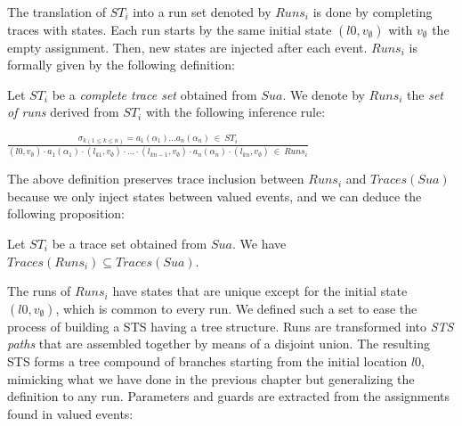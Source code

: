 The translation of $ST_i$ into a run set denoted by $Runs_i$ is
done by completing traces with states. Each run starts by the
same initial state $(l0,v_\emptyset)$ with $v_\emptyset$ the
empty assignment. Then, new states are injected after each event.
$Runs_i$ is formally given by the following definition:

\begin{definition}
    Let $ST_i$ be a \emph{complete trace set} obtained from
    $\mathit{Sua}$. We denote by $Runs_i$ the \emph{set of runs}
    derived from $ST_i$ with the following inference rule:

    \begin{center}
    {\Large
    $\frac{
        \sigma_{k(1\leq k \leq n)}=a_1(\alpha_1) \dots a_n(\alpha_n)~ \in ~ST_i
    }{
        (l0,v_\emptyset) \cdot a_1(\alpha_1) \cdot
        (l_{k1},v_\emptyset) \cdot \dots \cdot (l_{kn-1},v_\emptyset)
        \cdot a_n(\alpha_n) \cdot (l_{kn},v_\emptyset)~ \in ~Runs_i}$
    }
    \end{center}
\end{definition}

The above definition preserves trace inclusion \cite{petrenko06}
between $Runs_i$ and $Traces(Sua)$ because we only inject states
between valued events, and we can deduce the following
proposition:

\begin{proposition}
Let $ST_i$ be a trace set obtained from $\mathit{Sua}$. We have
$Traces(Runs_i) \subseteq Traces(Sua)$.
\end{proposition}

The runs of $Runs_i$ have states that are unique except for the
initial state $(l0,v_\emptyset)$, which is common to every run.
We defined such a set to ease the process of building a STS
having a tree structure. Runs are transformed into \emph{STS
paths} that are assembled together by means of a disjoint union.
The resulting STS forms a tree compound of branches starting from
the initial location $l0$, mimicking what we have done in the
previous chapter but generalizing the definition to any run.
Parameters and guards are extracted from the assignments found in
valued events:

